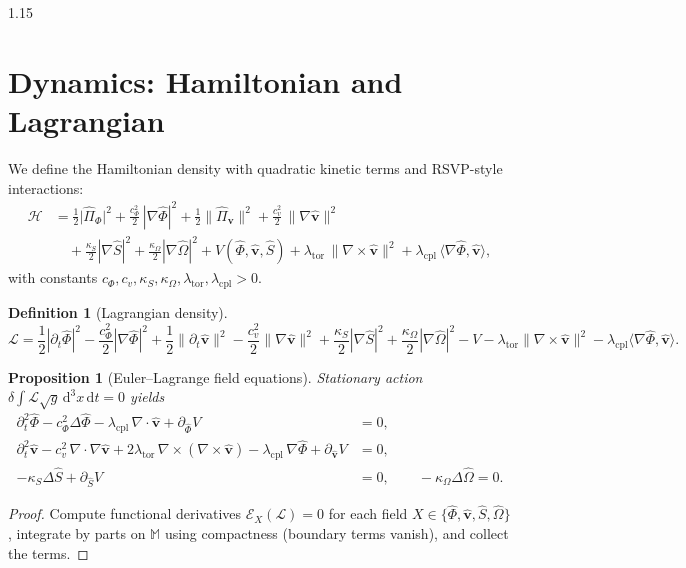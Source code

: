 \documentclass[12pt,a4paper]{article}
\numberwithin{equation}{section}
\theoremstyle{definition}
\newtheorem{definition}{Definition}[section]
\theoremstyle{plain}
\newtheorem{proposition}{Proposition}[section]
\theoremstyle{remark}
\newcommand{\M}{\mathbb{M}}
\newcommand{\hPhi}{\hat{\Phi}}
\newcommand{\hv}{\hat{\mathbf{v}}}
\newcommand{\hS}{\hat{S}}
\newcommand{\hPi}{\hat{\Pi}}
\newcommand{\hO}{\hat{\Omega}}
\newcommand{\Lcal}{\mathcal{L}}
\newcommand{\Hcal}{\mathcal{H}}
\newcommand{\D}{\mathrm{d}}
\begin{document}
\begin{spacing}{1.15}
\section{Dynamics: Hamiltonian and Lagrangian}\label{sec:dynamics}
We define the Hamiltonian density with quadratic kinetic terms and RSVP-style interactions:
\begin{align}
\Hcal &= \frac{1}{2}\big|\hPi_\Phi\big|^2 + \frac{c_\Phi^2}{2}\,|\nabla \hPhi|^2 
+ \frac{1}{2} \|\hPi_{\mathbf{v}}\|^2 + \frac{c_v^2}{2}\,\|\nabla \hv\|^2 \nonumber\\
&\quad + \frac{\kappa_S}{2}|\nabla \hS|^2 + \frac{\kappa_\Omega}{2}|\nabla \hO|^2 
+ V(\hPhi,\hv,\hS) + \lambda_\mathrm{tor} \,\|\nabla\times \hv\|^2 
+ \lambda_\mathrm{cpl} \,\langle \nabla \hPhi, \hv\rangle,
\end{align}
with constants $c_\Phi,c_v,\kappa_S,\kappa_\Omega,\lambda_\mathrm{tor},\lambda_\mathrm{cpl}>0$.

\begin{definition}[Lagrangian density]
\[
\Lcal = \frac{1}{2}|\partial_t \hPhi|^2 - \frac{c_\Phi^2}{2}|\nabla \hPhi|^2
+ \frac{1}{2}\|\partial_t \hv\|^2 - \frac{c_v^2}{2}\|\nabla \hv\|^2
+ \frac{\kappa_S}{2}|\nabla \hS|^2 + \frac{\kappa_\Omega}{2}|\nabla \hO|^2 - V - \lambda_\mathrm{tor}\|\nabla\times\hv\|^2 - \lambda_\mathrm{cpl}\langle \nabla\hPhi,\hv\rangle.
\]
\end{definition}

\begin{proposition}[Euler--Lagrange field equations]\label{prop:EL}
Stationary action $\delta \int \Lcal \sqrt{g}\,\D^3x\,\D t=0$ yields
\begin{align}
\partial_t^2 \hPhi - c_\Phi^2 \Delta \hPhi - \lambda_\mathrm{cpl}\,\nabla\cdot \hv + \partial_{\hPhi} V &= 0,\\
\partial_t^2 \hv - c_v^2 \,\nabla\cdot\nabla \hv + 2\lambda_\mathrm{tor}\,\nabla\times(\nabla\times \hv) - \lambda_\mathrm{cpl}\,\nabla \hPhi + \partial_{\hv} V &= 0,\\
-\kappa_S \Delta \hS + \partial_{\hS} V &= 0,\qquad
-\kappa_\Omega \Delta \hO = 0.
\end{align}
\end{proposition}
\begin{proof}
Compute functional derivatives $\mathcal{E}_X(\Lcal)=0$ for each field $X\in\{\hPhi,\hv,\hS,\hO\}$, integrate by parts on $\M$ using compactness (boundary terms vanish), and collect the terms.
\end{proof}


\end{spacing}
\end{document}
